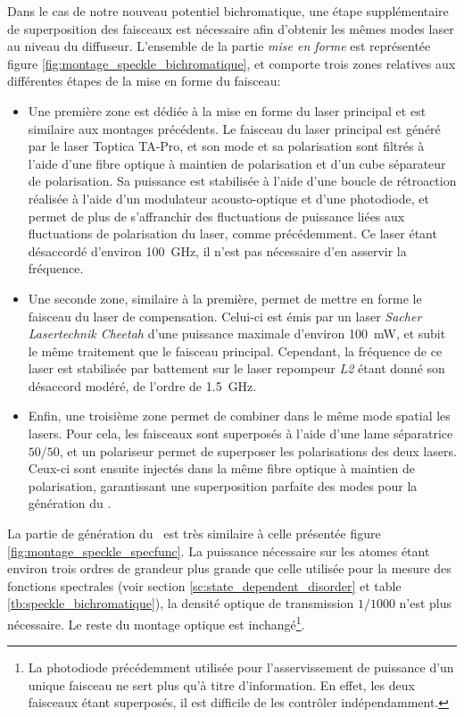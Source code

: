Dans le cas de notre nouveau potentiel bichromatique, une étape supplémentaire de superposition des faisceaux est nécessaire afin d'obtenir les mêmes modes laser au niveau du diffuseur. L'ensemble de la partie \emph{mise en forme} est représentée figure \ref{fig:montage_speckle_bichromatique}, et comporte trois zones relatives aux différentes étapes de la mise en forme du faisceau:
\begin{itemize}
\item[\textendash] Une première zone est dédiée à la mise en forme du laser principal et est similaire aux montages précédents. Le faisceau du laser principal est généré par le laser Toptica TA-Pro, et son mode et sa polarisation sont filtrés à l'aide d'une fibre optique à maintien de polarisation et d'un cube séparateur de polarisation. Sa puissance est stabilisée à l'aide d'une boucle de rétroaction réalisée à l'aide d'un modulateur acousto-optique et d'une photodiode, et permet de plus de s'affranchir des fluctuations de puissance liées aux fluctuations de polarisation du laser, comme précédemment. Ce laser étant désaccordé d'environ \SI{100}{\giga\hertz}, il n'est pas nécessaire d'en asservir la fréquence.
\item[\textendash] Une seconde zone, similaire à la première, permet de mettre en forme le faisceau du laser de compensation. Celui-ci est émis par un laser \emph{Sacher Lasertechnik Cheetah} d'une puissance maximale d'environ \SI{100}{\milli\watt}, et subit le même traitement que le faisceau principal. Cependant, la fréquence de ce laser est stabilisée par battement sur le laser repompeur \emph{L2} étant donné son désaccord modéré, de l'ordre de \SI{1.5}{\giga\hertz}.
\item[\textendash] Enfin, une troisième zone permet de combiner dans le même mode spatial les lasers. Pour cela, les faisceaux sont superposés à l'aide d'une lame séparatrice $50/50$, et un polariseur permet de superposer les polarisations des deux lasers. Ceux-ci sont ensuite injectés dans la même fibre optique à maintien de polarisation, garantissant une superposition parfaite des modes pour la génération du \speckle .
\end{itemize}


La partie de génération du \speckle\ est très similaire à celle présentée figure \ref{fig:montage_speckle_specfunc}. La puissance nécessaire sur les atomes étant environ trois ordres de grandeur plus grande que celle utilisée pour la mesure des fonctions spectrales (voir section \ref{sc:state_dependent_disorder} et table \ref{tb:speckle_bichromatique}), la densité optique de transmission $1/1000$ n'est plus nécessaire. Le reste du montage optique est inchangé\footnote{La photodiode précédemment utilisée pour l'asservissement de puissance d'un unique faisceau ne sert plus qu'à titre d'information. En effet, les deux faisceaux étant superposés, il est difficile de les contrôler indépendamment.}.

